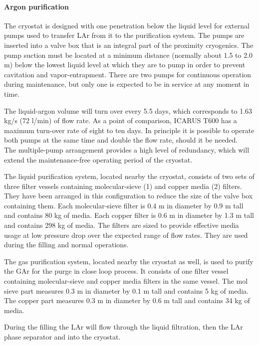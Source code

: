 \paragraph{Argon purification}

The cryostat is designed with one penetration below the liquid level for external pumps used to transfer LAr from it to the purification system. The pumps are inserted into a valve box that is an integral part of the proximity cryogenics. The pump suction must be located at a minimum distance (normally about 1.5 to 2.0 m) below the lowest liquid level at which they are to pump in order to prevent cavitation and vapor-entrapment. There are two pumps for continuous operation during maintenance, but only one is expected to be in service at any moment in time.

The liquid-argon volume will turn over every 5.5 days, which corresponds to 1.63 kg/s (72 l/min) of flow rate. As a point of comparison, ICARUS T600 has a maximum turn-over rate of eight to ten days. In principle it is possible to operate both pumps at the same time and double the flow rate, should it be needed.\\
%
The multiple-pump arrangement provides a high level of redundancy, which will extend the maintenance-free operating period of the cryostat.

The liquid purification system, located nearby the cryostat, consists of two sets of three filter vessels containing molecular-sieve (1) and copper media (2) filters. They have been arranged in this configuration to reduce the size of the valve box containing them. Each molecular-sieve filter is 0.4 m in diameter by 0.9 m tall and contains 80 kg of media. Each copper filter is 0.6 m in diameter by 1.3 m tall and contains 298 kg of media. The filters are sized to provide effective media usage at low pressure drop over the expected range of flow rates. They are used during the filling and normal operations.

The gas purification system, located nearby the cryostat as well, is used to purify the GAr for the purge in close loop process. It consists of one filter vessel containing molecular-sieve and copper media filters in the same vessel. The mol sieve part measures 0.3 m in diameter by 0.1 m tall and contains 5 kg of media. The copper part measures 0.3 m in diameter by 0.6 m tall and contains 34 kg of media.

During the filling the LAr will flow through the liquid filtration, then the LAr phase separator and into the cryostat.

